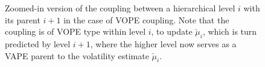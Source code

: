 \begin{figure}
  \caption{Zoomed-in version of the coupling between a hierarchical level $i$ with its parent $i+1$ in the case of \textsf{VOPE} coupling. Note that the coupling is of \textsf{VOPE} type within level $i$, to update $\check{\mu}_i$, which is turn predicted by level $i+1$, where the higher level now serves as a \textsf{VAPE} parent to the volatility estimate $\check{\mu}_i$.}
  \label{\figlabel}
\end{figure}
